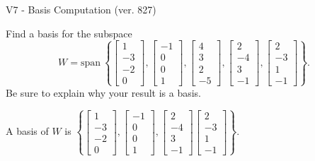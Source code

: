 \begin{exercise}
  \begin{exerciseTitle}V7 - Basis Computation (ver. 827)\end{exerciseTitle}
  \begin{exerciseStatement}
    Find a basis for the subspace 
\[W=\mathrm{span}\ \left\{\left[\begin{array}{r}
1 \\
-3 \\
-2 \\
0
\end{array}\right] , \left[\begin{array}{r}
-1 \\
0 \\
0 \\
1
\end{array}\right] , \left[\begin{array}{r}
4 \\
3 \\
2 \\
-5
\end{array}\right] , \left[\begin{array}{r}
2 \\
-4 \\
3 \\
-1
\end{array}\right] , \left[\begin{array}{r}
2 \\
-3 \\
1 \\
-1
\end{array}\right]\right\}.\]
 Be sure to explain why your result is a basis.


  \end{exerciseStatement}
  \begin{exerciseAnswer}
   A basis of \(W\) is  \(\left\{\left[\begin{array}{r}
1 \\
-3 \\
-2 \\
0
\end{array}\right] , \left[\begin{array}{r}
-1 \\
0 \\
0 \\
1
\end{array}\right] , \left[\begin{array}{r}
2 \\
-4 \\
3 \\
-1
\end{array}\right] \left[\begin{array}{r}
2 \\
-3 \\
1 \\
-1
\end{array}\right]\right\}\).
  


  \end{exerciseAnswer}
\end{exercise}